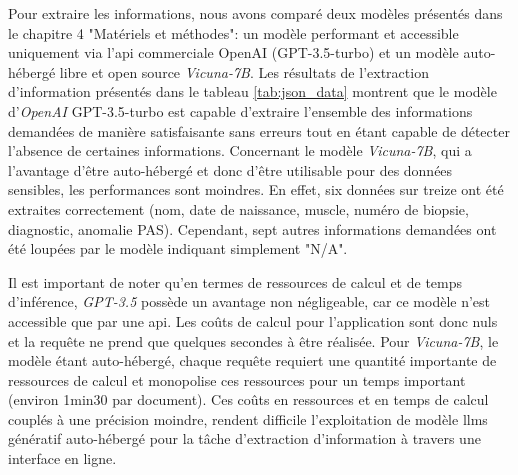 Pour extraire les informations, nous avons comparé deux modèles présentés dans le chapitre 4 "Matériels et méthodes": un modèle performant et accessible uniquement via l'\gls{api} commerciale OpenAI (GPT-3.5-turbo) et un modèle auto-hébergé libre et open source \textit{Vicuna-7B}. Les résultats de l'extraction d'information présentés dans le tableau \ref{tab:json_data} montrent que le modèle d'\textit{OpenAI} GPT-3.5-turbo est capable d'extraire l'ensemble des informations demandées de manière satisfaisante sans erreurs tout en étant capable de détecter l'absence de certaines informations. Concernant le modèle \textit{Vicuna-7B}, qui a l'avantage d'être auto-hébergé et donc d'être utilisable pour des données sensibles, les performances sont moindres. En effet, six données sur treize ont été extraites correctement (nom, date de naissance, muscle, numéro de biopsie, diagnostic, anomalie PAS). Cependant, sept autres informations demandées ont été loupées par le modèle indiquant simplement "N/A".

Il est important de noter qu'en termes de ressources de calcul et de temps d'inférence, \textit{GPT-3.5} possède un avantage non négligeable, car ce modèle n'est accessible que par une \gls{api}. Les coûts de calcul pour l'application sont donc nuls et la requête ne prend que quelques secondes à être réalisée. Pour \textit{Vicuna-7B}, le modèle étant auto-hébergé, chaque requête requiert une quantité importante de ressources de calcul et monopolise ces ressources pour un temps important (environ 1min30 par document). Ces coûts en ressources et en temps de calcul couplés à une précision moindre, rendent difficile l'exploitation de modèle \gls{llms} génératif auto-hébergé pour la tâche d'extraction d'information à travers une interface en ligne. 


